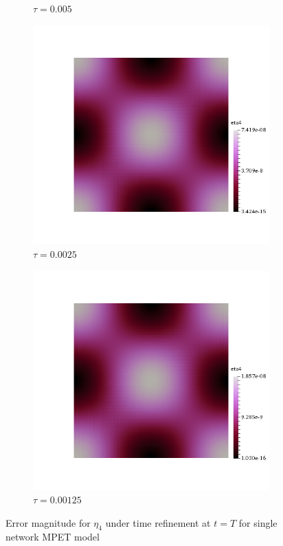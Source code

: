 \begin{figure}[h!]
\begin{subfigure}[b]{0.24\textwidth}
    \caption{$\tau=0.005$}
  \end{subfigure}
  \begin{subfigure}[b]{0.24\textwidth}
    \includegraphics[width=\textwidth,height=\textheight,keepaspectratio,height=\textheight,keepaspectratio]{figures/1_mpet/time/eta4_dt3.png}
    \caption{$\tau=0.0025$}
  \end{subfigure}
  \begin{subfigure}[b]{0.24\textwidth}
    \includegraphics[width=\textwidth,height=\textheight,keepaspectratio,height=\textheight,keepaspectratio]{figures/1_mpet/time/eta4_dt4.png}
    \caption{$\tau=0.00125$}
  \end{subfigure}
  \caption{Error magnitude for $\eta_4$ under time refinement at $t=T$ for single network MPET model} \label{fig:biot_eta4}
\end{figure}

